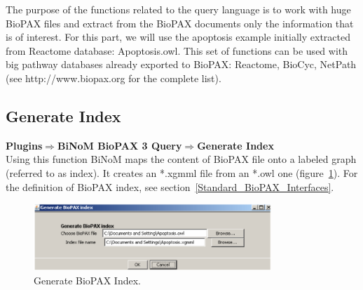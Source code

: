 The purpose of the functions related to the query language is to work with huge BioPAX files and extract from the BioPAX documents only the information that is of interest. For this part, we will use the apoptosis example initially extracted from Reactome database: Apoptosis.owl. This set of functions can be used with big pathway databases already exported to BioPAX: Reactome, BioCyc, NetPath (see http://www.biopax.org for the complete list).

\subsection{Generate Index}
\textbf{Plugins$\Rightarrow$BiNoM BioPAX 3 Query$\Rightarrow$Generate Index}\\
Using this function BiNoM maps the content of BioPAX file onto a labeled graph (referred to as index). It creates an *.xgmml file from an *.owl one (figure~\ref{Generate_BioPAX_Index}). For the definition of BioPAX index, see section~\ref{Standard_BioPAX_Interfaces}.
\begin{figure}[h]
\centering
\includegraphics[width=0.8\textwidth]{graphics/Generate_BioPAX_Index}
\caption{Generate BioPAX Index.}
\label{Generate_BioPAX_Index}
\end{figure}

